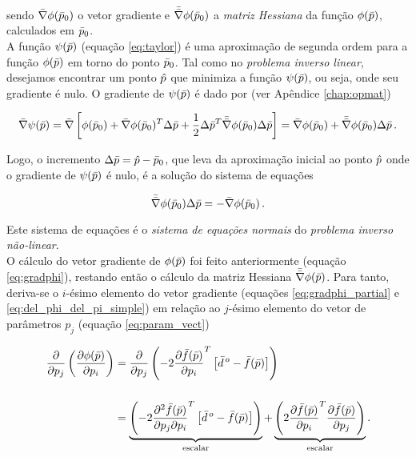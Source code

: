 \noindent sendo $\bar{\nabla}\phi(\bar{p}_0)$ o vetor gradiente  e
$\bar{\bar{\nabla}}\phi(\bar{p}_0)$ a {\it matriz Hessiana} da função $\phi(\bar{p})$,
calculados em $\bar{p}_0$.
\\
\indent A função $\psi(\bar{p})$ (equação \ref{eq:taylor}) é uma aproximação
de segunda ordem para a função $\phi(\bar{p})$ em torno do ponto $\bar{p}_0$.
Tal como no {\it problema inverso linear}, desejamos encontrar um ponto $\hat{p}$
que minimiza a função $\psi(\bar{p})$, ou seja, onde seu gradiente é nulo.
O gradiente de $\psi(\bar{p})$ é dado por (ver Apêndice \ref{chap:opmat})

\begin{equation}
\bar{\nabla}\psi(\bar{p}) = \bar{\nabla}\left[
    \phi(\bar{p}_0) +
    \bar{\nabla}\phi(\bar{p}_0)^T\Delta\bar{p} +
    \dfrac{1}{2}\Delta\bar{p}^T\bar{\bar{\nabla}}\phi(\bar{p}_0)\Delta\bar{p}
    \right] =
    \bar{\nabla}\phi(\bar{p}_0) + \bar{\bar{\nabla}}\phi(\bar{p}_0)\Delta\bar{p}
    \thinspace .
\end{equation}

\noindent Logo, o incremento $\Delta\bar{p} = \hat{p} - \bar{p}_0$, que leva
da aproximação inicial ao ponto $\hat{p}$ onde o gradiente de $\psi(\bar{p})$ é
nulo, é a solução do sistema de equações

\begin{equation}
     \bar{\bar{\nabla}}\phi(\bar{p}_0)\Delta\bar{p} = -\bar{\nabla}\phi(\bar{p}_0)
    \thinspace .
\label{eq:sistema_normal_nlin}
\end{equation}

\noindent Este sistema de equações é o {\it sistema de equações normais} do
{\it problema inverso não-linear}.
\\
\indent O cálculo do vetor gradiente de $\phi(\bar{p})$ foi feito anteriormente
(equação \ref{eq:gradphi}), restando então o cálculo da matriz Hessiana
$\bar{\bar{\nabla}}\phi(\bar{p})$.
Para tanto, deriva-se o $i$-ésimo elemento do vetor gradiente
(equações \ref{eq:gradphi_partial} e \ref{eq:del_phi_del_pi_simple}) em relação
ao $j$-ésimo elemento do vetor de parâmetros $p_j$ (equação \ref{eq:param_vect})

\begin{equation}
\begin{split}
\dfrac{\partial}{\partial p_j}\left(\dfrac{\partial \phi(\bar{p})}{\partial p_i}\right)
&=
\dfrac{\partial}{\partial p_j}\left(
    -2\dfrac{\partial\bar{f}(\bar{p})}{\partial p_i}^T
    \left[\bar{d}^{\thinspace o} - \bar{f}(\bar{p})\right]
    \right)
\\[0.5cm]
&=
\underbrace{
\left( -2\dfrac{\partial^2 \bar{f}(\bar{p})}{\partial p_j \partial p_i}^T
\left[\bar{d}^{\thinspace o} - \bar{f}(\bar{p})\right]
\right)}_{\text{escalar}} +
\underbrace{
\left( 2 \dfrac{\partial\bar{f}(\bar{p})}{\partial p_i}^T
    \dfrac{\partial\bar{f}(\bar{p})}{\partial p_j} \right)}_{\text{escalar}} .
\end{split}
\label{eq:hessian_ij_exact}
\end{equation}

